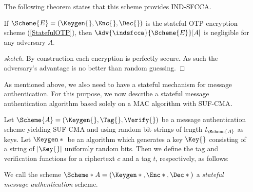 The following theorem states that this scheme provides \ac{IND-SFCCA}.

\begin{theorem}
  If \(\Scheme{E} = (\Keygen{}, \Enc{}, \Dec{})\) is the stateful \ac{OTP} 
  encryption scheme (\cref{StatefulOTP}),
  then \(\Adv{\indsfcca}{\Scheme{E}}[ A ]\) is negligible for any adversary 
  \(A\).
\end{theorem}
\begin{proof}[sketch]
  By construction each encryption is perfectly secure.
  As such the adversary's advantage is no better than random guessing.
\end{proof}

As mentioned above, we also need to have a stateful mechanism for message 
authentication.
For this purpose, we now describe a stateful message authentication algorithm 
based solely on a \ac{MAC} algorithm with \ac{SUF-CMA}.

\begin{definition}
  Let \(\Scheme{A} = (\Keygen{}, \Tag{}, \Verify{})\) be a message 
  authentication scheme yielding \ac{SUF-CMA} and using random bit-strings of 
  length \(l_{\Scheme{A}}\) as keys.
  Let \(\Keygen*{}\) be an algorithm which generates a key \(\Key{}\) 
  consisting of a string of \(|\Key{}|\) uniformly random bits.
  Then we define the tag and verification functions for a ciphertext \(c\) and 
  a tag \(t\), respectively, as follows:
  \begin{center}
    \normalfont{}
    \begin{minipage}[t]{0.4\textwidth}
      \begin{algorithmic}
            \State{\Return{$\bot$}}
          \EndIf{}
        \EndFunction{}
      \end{algorithmic}
    \end{minipage}%
    \vline%
    \begin{minipage}[t]{0.4\textwidth}
      \begin{algorithmic}
            \State{\Return{$\bot$}}
          \EndIf{}
          \EndIf{}
        \EndFunction{}
      \end{algorithmic}
    \end{minipage}
  \end{center}
  We call the scheme \(\Scheme*{A} = (\Keygen*{}, \Enc*{}, \Dec*{})\) 
  a \emph{stateful message authentication} scheme.
\end{definition}

